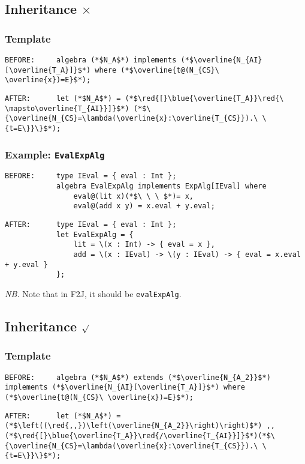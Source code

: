 \documentclass{article}
\newcommand{\red}[1]{\textcolor{red}{#1}}
\newcommand{\blue}[1]{\textcolor{blue}{#1}}
\newcommand{\nb}{\textit{NB. }}
\begin{document}
\begin{spacing}{1.1}
\subsection{Inheritance $\times$}

\subsubsection{Template}

\begin{lstlisting}[numbers=none]
BEFORE:     algebra (*$N_A$*) implements (*$\overline{N_{AI}[\overline{T_A}]}$*) where (*$\overline{t@(N_{CS}\ \overline{x})=E}$*);
\end{lstlisting}
\begin{lstlisting}[numbers=none]
AFTER:      let (*$N_A$*) = (*$\red{[}\blue{\overline{T_A}}\red{\ \mapsto\overline{T_{AI}}]}$*) (*$\{\overline{N_{CS}=\lambda(\overline{x}:\overline{T_{CS}}).\ \{t=E\}}\}$*);
\end{lstlisting}

\subsubsection{Example: \lstinline{EvalExpAlg}}

\begin{lstlisting}[numbers=none]
BEFORE:     type IEval = { eval : Int };
            algebra EvalExpAlg implements ExpAlg[IEval] where
                eval@(lit x)(*$\ \ \ $*)= x,
                eval@(add x y) = x.eval + y.eval;
\end{lstlisting}
\begin{lstlisting}[numbers=none]
AFTER:      type IEval = { eval : Int };
            let EvalExpAlg = {
                lit = \(x : Int) -> { eval = x },
                add = \(x : IEval) -> \(y : IEval) -> { eval = x.eval + y.eval }
            };
\end{lstlisting}

\nb Note that in F2J, it should be \lstinline{evalExpAlg}.

\subsection{Inheritance $\surd$}

\subsubsection{Template}

\begin{lstlisting}[numbers=none]
BEFORE:     algebra (*$N_A$*) extends (*$\overline{N_{A_2}}$*) implements (*$\overline{N_{AI}[\overline{T_A}]}$*) where (*$\overline{t@(N_{CS}\ \overline{x})=E}$*);
\end{lstlisting}
\begin{lstlisting}[numbers=none]
AFTER:      let (*$N_A$*) =  (*$\left((\red{,,})\left(\overline{N_{A_2}}\right)\right)$*) ,, (*$\red{[}\blue{\overline{T_A}}\red{/\overline{T_{AI}}]}$*)(*$\{\overline{N_{CS}=\lambda(\overline{x}:\overline{T_{CS}}).\ \{t=E\}}\}$*);
\end{lstlisting}


\end{spacing}
\end{document}
